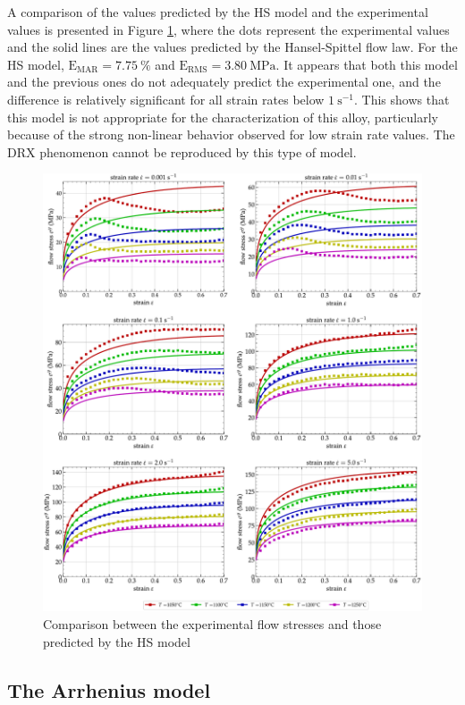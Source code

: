 \documentclass[metals,article,submit,pdftex,moreauthors]{Definitions/mdpi}
\DeclareRobustCommand{\RMSE}{\text{E}_\text{RMS}}
\DeclareRobustCommand{\MARE}{\text{E}_\text{MAR}}
\DeclareRobustCommand{\ps}{\text{s}^{-1}}
\DeclareRobustCommand{\MPa}{\text{MPa}}
\begin{document}
A comparison of the values predicted by the HS model and the experimental values is presented in Figure \ref{fig:CompExp-HS-6}, where the dots represent the experimental values and the solid lines are the values predicted by the Hansel-Spittel flow law.
For the HS model, $\MARE=7.75~\%$ and $\RMSE=3.80~\MPa$.
It appears that both this model and the previous ones do not adequately predict the experimental one, and the difference is relatively significant for all strain rates below $1~\ps$.
This shows that this model is not appropriate for the characterization of this alloy, particularly because of the strong non-linear behavior observed for low strain rate values.
The DRX phenomenon cannot be reproduced by this type of model.

\begin{figure}[!ht]
\centering
\includegraphics[width=\columnwidth]
{Figures/CompExp-HS-6}
\caption{Comparison between the experimental flow stresses and those predicted by the HS model}
\label{fig:CompExp-HS-6}
\end{figure}

\subsection{The Arrhenius model\label{sec:ARmodel}}
\end{document}
